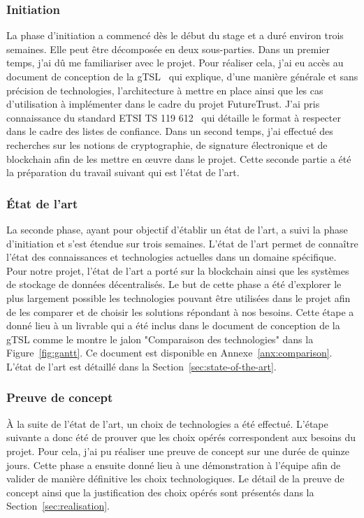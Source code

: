 \documentclass{tnreport}
\begin{document}
\subsubsection{Initiation}

La phase d'initiation a commencé dès le début du stage et a duré environ trois semaines. 
Elle peut être décomposée en deux sous-parties. Dans un premier temps, j'ai dû me familiariser avec le projet. Pour réaliser cela, j'ai eu accès au document de conception de la gTSL~\cite{design-document} qui explique, d'une manière générale et sans précision de technologies, l'architecture à mettre en place ainsi que les cas d'utilisation à implémenter dans le cadre du projet FutureTrust. J'ai pris connaissance du standard ETSI TS 119 612~\cite{ETSITS119612} qui détaille le format à respecter dans le cadre des listes de confiance. Dans un second temps, j'ai effectué des recherches sur les notions de cryptographie, de signature électronique et de blockchain afin de les mettre en œuvre dans le projet. Cette seconde partie a été la préparation du travail suivant qui est l'état de l'art.

\subsubsection{État de l'art}

La seconde phase, ayant pour objectif d'établir un état de l'art, a suivi la phase d'initiation et s'est étendue sur trois semaines.
L'état de l'art permet de connaître l'état des connaissances et technologies actuelles dans un domaine spécifique. Pour notre projet, l'état de l'art a porté sur la blockchain ainsi que les systèmes de stockage de données décentralisés. Le but de cette phase a été d'explorer le plus largement possible les technologies pouvant être utilisées dans le projet afin de les comparer et de choisir les solutions répondant à nos besoins. Cette étape a donné lieu à un livrable qui a été inclus dans le document de conception de la gTSL comme le montre le jalon "Comparaison des technologies" dans la Figure~\ref{fig:gantt}. Ce document est disponible en Annexe~\ref{anx:comparison}. L'état de l'art est détaillé dans la Section~\ref{sec:state-of-the-art}.

\subsubsection{Preuve de concept}

À la suite de l'état de l'art, un choix de technologies a été effectué. L'étape suivante a donc été de prouver que les choix opérés correspondent aux besoins du projet. Pour cela, j'ai pu réaliser une preuve de concept sur une durée de quinze jours. Cette phase a ensuite donné lieu à une démonstration à l'équipe afin de valider de manière définitive les choix technologiques. Le détail de la preuve de concept ainsi que la justification des choix opérés sont présentés dans la Section~\ref{sec:realisation}.
\end{document}
